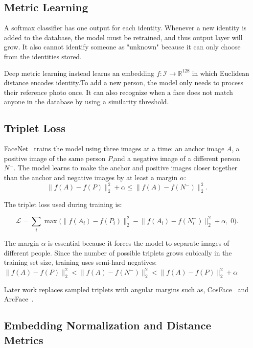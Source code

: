 \documentclass[conference]{IEEEtran}
\begin{document}
\subsection{Metric Learning}

A softmax classifier has one output for each identity. Whenever a new identity is added to the database, the model must be retrained, and thus output layer will grow. It also cannot identify someone as "unknown" because it can only choose from the identities stored.

Deep metric learning instead learns an embedding
$f:\mathcal{I}\rightarrow\mathbb{R}^{128}$ in which Euclidean distance encodes
identity.To add a new person, the model only needs to process their reference photo once. It can also recognize when a face does not match anyone in the database by using a similarity threshold.

\subsection{Triplet Loss}

FaceNet~\cite{schroff2015facenet} trains the model using three images at a time: an anchor image
$A$, a positive image of the same person $P$,and a negative image of a different person $N^-$. The model learns to make the anchor and positive images closer together than the anchor and negative images by at least a margin $\alpha$:
\[
\|f(A)-f(P)\|_2^2 + \alpha \le \|f(A)-f(N^-)\|_2^2.
\]

The triplet loss used during training is:

\begin{equation}
\mathcal{L}=\sum_i \max\!\big(\lVert f(A_i)-f(P_i)\rVert_2^2
 -\lVert f(A_i)-f(N^-_i)\rVert_2^2+\alpha,\;0\big).
\end{equation}

The margin $\alpha$ is essential because it forces the model to separate images of different people. Since the number of possible triplets grows cubically in the training set size, training uses semi-hard negatives:
\
$\lVert f(A)-f(P)\rVert_2^2 < \lVert f(A)-f(N^-)\rVert_2^2 <
 \lVert f(A)-f(P)\rVert_2^2+\alpha$
 \
 
Later work replaces sampled triplets with angular margins such as, CosFace~\cite{wang2018cosface} and ArcFace~\cite{deng2019arcface}.

\subsection{Embedding Normalization and Distance Metrics}
\end{document}

